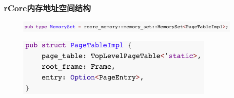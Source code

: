 \begin{frame}[fragile]
    \frametitle{rCore内存地址空间结构}
    \begin{figure}
    \includegraphics[width=0.8\linewidth]{figs/type-MemorySet.png}
    \end{figure}


    \begin{figure}
    \includegraphics[width=0.5\linewidth]{figs/PageTableImpl.png}
    \end{figure}

\end{frame}
